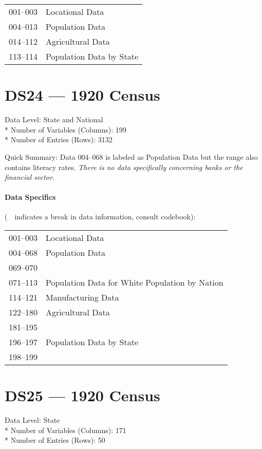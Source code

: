 ﻿\documentclass[12pt]{report}
\begin{document}
	\begin{tabular}{r|l}
		001--003 & Locational Data\\
		004--013 & Population Data\\
		014--112 & Agricultural Data\\
		113--114 & Population Data by State
	\end{tabular}
	\newpage

\section{DS24 --- 1920 Census}
	Data Level: State and National\\*
	Number of Variables (Columns): 199\\*
	Number of Entries (Rows): 3132
	\vspace{1.5em}
	
	\noindent Quick Summary: Data 004--068 is labeled as Population Data but the range also contains literacy rates. \textit{There is no data specifically concerning banks or the financial sector.}
	
	\paragraph{Data Specifics} (\guillemotleft~\guillemotright~indicates a break in data information, consult codebook):
	\vspace{1em}
	
	\begin{tabular}{r|l}
		001--003 & Locational Data\\
		004--068 & Population Data\\
		069--070 & \guillemotleft~\guillemotright\\
		071--113 & Population Data for White Population by Nation\\
		114--121 & Manufacturing Data\\
		122--180 & Agricultural Data\\
		181--195 & \guillemotleft~\guillemotright\\
		196--197 & Population Data by State\\
		198--199 & \guillemotleft~\guillemotright
	\end{tabular}
	\newpage

\section{DS25 --- 1920 Census}
	Data Level: State\\*
	Number of Variables (Columns): 171\\*
	Number of Entries (Rows): 50
	\vspace{1.5em}
	
\end{document}
